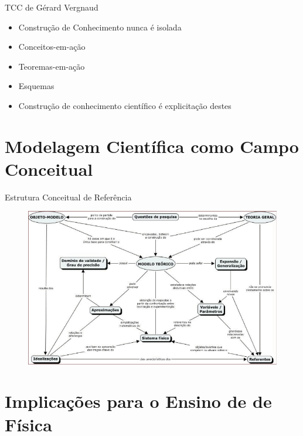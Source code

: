 \documentclass{beamer}
\begin{document}
\begin{frame}{TCC de Gérard Vergnaud}
\begin{itemize}
    \item Construção de Conhecimento nunca é isolada
\end{itemize}
\vspace{2em}
\begin{itemize}
    \item Conceitos-em-ação
    \item Teoremas-em-ação
    \item Esquemas
\end{itemize}
\vspace{2em}
\begin{itemize}
    \item Construção de conhecimento científico é explicitação destes
\end{itemize}
\end{frame}

\section{Modelagem Científica como Campo Conceitual}
\begin{frame}{Estrutura Conceitual de Referência}
    \begin{figure}
        \centering
        \includegraphics[width=\linewidth]{TCCModel.jpeg}
    \end{figure}
\end{frame}

\section{Implicações para o Ensino de de Física}
\end{document}
